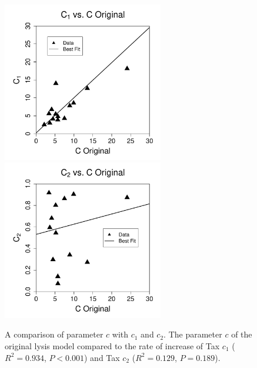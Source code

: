 \begin{figure}[htp]
\centering
\includegraphics[width=7cm]{./Figures/chapter5/figurec1cOrig}%
\hspace{0cm}%
\includegraphics[width=7cm]{./Figures/chapter5/figurec2cOrig} \\
\caption[A comparison of parameter $c$ with $c_1$ and $c_2$]{A comparison of parameter $c$ with $c_1$ and $c_2$. The parameter $c$ of the original lysis model  compared to the rate of increase of Tax $c_1$ ($R^2 = 0.934$, $P < 0.001$) and Tax $c_2$ ($R^2 = 0.129$, $P = 0.189$).}
\label{appendixb/figure3}
\end{figure}

